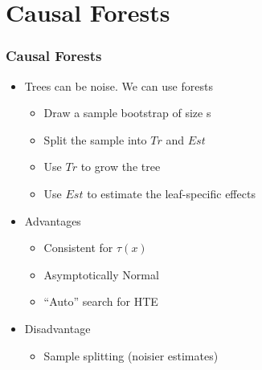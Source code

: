 \documentclass[
  shownotes,
  xcolor={svgnames},
  hyperref={colorlinks,citecolor=DarkBlue,linkcolor=DarkRed,urlcolor=DarkBlue}
  , aspectratio=169]{beamer}
\begin{document}
\section{Causal Forests}
\begin{frame}[fragile]
\frametitle{Causal Forests}

\begin{itemize}
\item Trees can be noise. We can use forests
\begin{itemize}
 \item Draw a sample bootstrap of size s
 \item Split the sample into $Tr$ and $Est$
 \item Use $Tr$ to grow the tree
 \item Use $Est$ to estimate the leaf-specific effects
\end{itemize}
\item Advantages
\begin{itemize}
  \item Consistent for $\tau(x)$
  \item Asymptotically Normal
  \item ``Auto'' search for HTE  
\end{itemize}
\item Disadvantage
\begin{itemize}
 \item Sample splitting (noisier estimates)
\end{itemize}
\end{itemize}
\end{frame}

\end{document}
